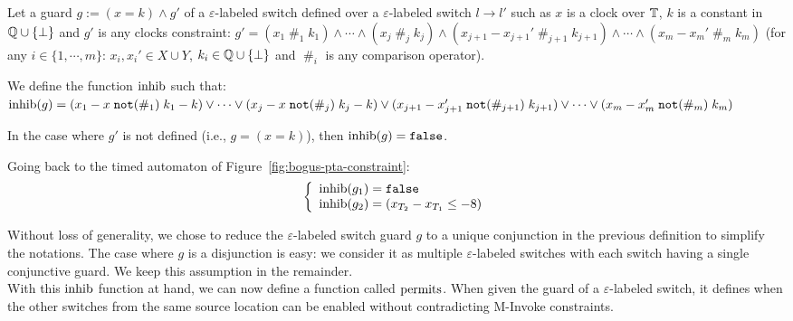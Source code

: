 \begin{definition}

Let a guard $g := (x = k) \wedge g'$ of a $\varepsilon$-labeled switch defined over a $\varepsilon$-labeled switch $l \rightarrow l'$ such as $x$ is a clock over $\mathbb{T}$, $k$ is a constant in $\mathbb{Q} \cup \{ \perp \}$ and $g'$ is any clocks constraint:
$ g' = 
(x_1 \;\#_1\; k_1) \wedge
 \cdots \wedge
 (x_j \;\#_j\; k_j) \wedge
 (x_{j+1} - x_{j+1}' \;\#_{j+1}\; k_{j+1}) \wedge
 \cdots \wedge
 (x_{m} - x_{m}' \;\#_{m}\; k_{m})
$
(for any $i \in \{1, \cdots, m\}$: $x_i, x_i' \in X \cup Y$, $k_i \in \mathbb{Q} \cup \{ \perp \}$ and $\;\#_i\;$ is any comparison operator).

We define the function $\operatorname{inhib}$ such that:
$
\operatorname{inhib}(g) =
  (x_1 - x \;\mathtt{not}(\#_1)\; k_1 - k) \vee 
  \cdots \vee 
  (x_j - x \;\mathtt{not}(\#_j)\; k_j - k) \vee
  (x_{j+1} - x_{j+1}' \;\mathtt{not}(\#_{j+1})\; k_{j+1}) \vee
  \cdots \vee 
  (x_{m} - x_{m}' \;\mathtt{not}(\#_{m})\; k_{m}) 
$

In the case where $g'$ is not defined (i.e., $g = (x = k)$), then $\operatorname{inhib}(g) = \mathtt{false}$.
\end{definition}

Going back to the timed automaton of Figure~\ref{fig:bogus-pta-constraint}:
$$
\left\lbrace
\begin{array}{l}
  \operatorname{inhib}(g_1) = \mathtt{false} \\
  \operatorname{inhib}(g_2) = (x_{T_2} - x_{T_1} \leq -8) \\
\end{array}
\right.
$$

Without loss of generality, we chose to reduce the $\varepsilon$-labeled switch guard $g$ to a unique conjunction in the previous definition to simplify the notations. The case where $g$ is a disjunction is easy: we consider it as multiple $\varepsilon$-labeled switches with each switch having a single conjunctive guard. We keep this assumption in the remainder.\\

With this $\operatorname{inhib}$ function at hand, we can now define a function called $\operatorname{permits}$. When given the guard of a $\varepsilon$-labeled switch, it defines when the other switches from the same source location can be enabled without contradicting M-Invoke constraints.

